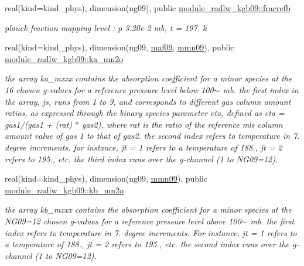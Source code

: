 \begin{DoxyCompactItemize}
real(kind=kind\+\_\+phys), dimension(ng09), public \hyperlink{group__module__radlw__kgbnn_ga26476f00fe13c1c81d3ae0cf8e43c90b}{module\+\_\+radlw\+\_\+kgb09\+::fracrefb}
\begin{DoxyCompactList}\small\item\em planck fraction mapping level \+: p 3.\+20e-\/2 mb, t = 197. k \end{DoxyCompactList}\item 
\mbox{\label{group__module__radlw__kgbnn_ga37d98e8066c5995060a2a8451b45705f}} 
real(kind=kind\+\_\+phys), dimension(ng09, \hyperlink{group__module__radlw__kgbnn_ga7d5d565c87af7ef07dc17930f9cb9e57}{maf09}, \hyperlink{group__module__radlw__kgbnn_gaa9c8294b56ac3ce90b07114e986777a9}{mmn09}), public \hyperlink{group__module__radlw__kgbnn_ga37d98e8066c5995060a2a8451b45705f}{module\+\_\+radlw\+\_\+kgb09\+::ka\+\_\+mn2o}
\begin{DoxyCompactList}\small\item\em the array ka\+\_\+mxxx contains the absorption coefficient for a minor species at the 16 chosen g-\/values for a reference pressure level below 100$\sim$ mb. the first index in the array, js, runs from 1 to 9, and corresponds to different gas column amount ratios, as expressed through the binary species parameter eta, defined as eta = gas1/(gas1 + (rat) $\ast$ gas2), where rat is the ratio of the reference mls column amount value of gas 1 to that of gas2. the second index refers to temperature in 7. degree increments. for instance, jt = 1 refers to a temperature of 188., jt = 2 refers to 195., etc. the third index runs over the g-\/channel (1 to N\+G09=12). \end{DoxyCompactList}\item 
\mbox{\label{group__module__radlw__kgbnn_ga79326139db789012d47c4750917c2cdb}} 
real(kind=kind\+\_\+phys), dimension(ng09, \hyperlink{group__module__radlw__kgbnn_gaa9c8294b56ac3ce90b07114e986777a9}{mmn09}), public \hyperlink{group__module__radlw__kgbnn_ga79326139db789012d47c4750917c2cdb}{module\+\_\+radlw\+\_\+kgb09\+::kb\+\_\+mn2o}
\begin{DoxyCompactList}\small\item\em the array kb\+\_\+mxxx contains the absorption coefficient for a minor species at the N\+G09=12 chosen g-\/values for a reference pressure level above 100$\sim$ mb. the first index refers to temperature in 7. degree increments. For instance, jt = 1 refers to a temperature of 188., jt = 2 refers to 195., etc. the second index runs over the g-\/channel (1 to N\+G09=12). \end{DoxyCompactList}\item 

\end{DoxyCompactItemize}
